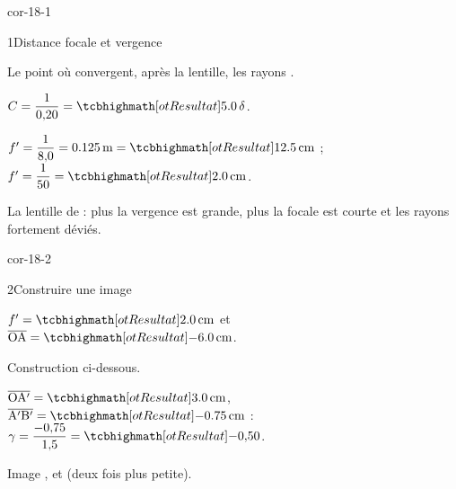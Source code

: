 \corrigesSouples

\begin{blocLivre}{cor-18-1}
\begin{corrige}{1}{Distance focale et vergence}
\begin{questions}
\item Le point où convergent, après la lentille, les rayons .
\item $C=\dfrac{1}{0{,}20}=\res{\num{5,0}\,\delta}$.
\item $f'=\dfrac{1}{8{,}0}=\qty{0,125}{m}=\res{\qty{12,5}{cm}}$ ; $f'=\dfrac{1}{50}=\res{\qty{2,0}{cm}}$.
\item La lentille de  : plus la vergence est grande, plus la focale est courte et les rayons fortement déviés.
\end{questions}
\end{corrige}
\end{blocLivre}
\begin{blocLivre}{cor-18-2}
\begin{corrige}{2}{Construire une image}
\begin{questions}
\item $f'=\res{\qty{2,0}{cm}}$ et $\alg{OA}=\res{\qty{-6,0}{cm}}$.
\item Construction ci-dessous.
\item $\alg{OA'}=\res{\qty{3,0}{cm}}$, $\alg{A'B'}=\res{\qty{-0,75}{cm}}$ : $\gamma=\dfrac{-0{,}75}{1{,}5}=\res{-0{,}50}$.
\item Image ,  et  (deux fois plus petite).
\end{questions}
\end{corrige}
\end{blocLivre}

